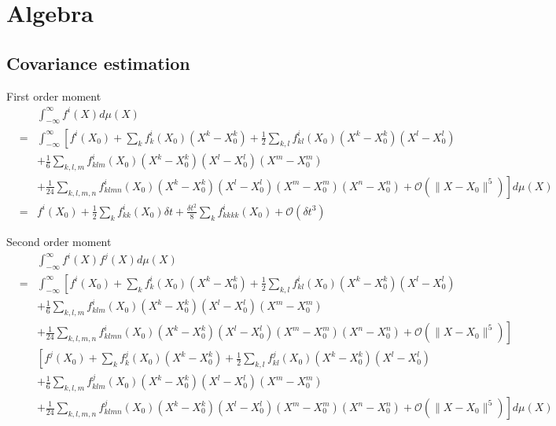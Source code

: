 \documentclass[12pt]{article}
\begin{document}
\appendix

\section{Algebra}

\subsection{Covariance estimation}

First order moment
\begin{eqnarray}
&&\int_{-\infty}^{\infty} f^i(X) d\mu(X) \\
&= & \int_{-\infty}^{\infty} \left[ f^i(X_0) + \sum_k f^i_k(X_0) (X^k-X_0^k)  + \frac{1}{2} \sum_{k,l} f^i_{kl}(X_0) (X^k-X_0^k) (X^l-X_0^l)  \right. \\
&& + \frac{1}{6} \sum_{k,l,m} f^i_{klm} (X_0) (X^k-X_0^k) (X^l-X_0^l) (X^m-X_0^m) \\
&& \left. + \frac{1}{24} \sum_{k,l,m,n} f^i_{klmn} (X_0) (X^k-X_0^k) (X^l-X_0^l) (X^m-X_0^m) (X^n-X_0^n)
+ \mathcal{O}\left( \| X- X_0 \|^5 \right) \right] d\mu(X) \\
&=& f^i(X_0) + \frac{1}{2} \sum_k f^i_{kk}(X_0) \delta t + \frac{\delta t^2}{8} \sum_{k} f^i_{kkkk} (X_0) + \mathcal{O} (\delta t^3 )
\end{eqnarray}

Second order moment
\begin{eqnarray}
&&\int_{-\infty}^{\infty} f^i(X) f^j(X) d\mu(X) \\
&= &
\int_{-\infty}^{\infty} \left[ f^i(X_0) + \sum_k f^i_k(X_0) (X^k-X_0^k)  + \frac{1}{2} \sum_{k,l} f^i_{kl}(X_0) (X^k-X_0^k) (X^l-X_0^l) \right. \\
&&  + \frac{1}{6} \sum_{k,l,m} f^i_{klm} (X_0) (X^k-X_0^k) (X^l-X_0^l) (X^m-X_0^m) \\
&& \left. + \frac{1}{24} \sum_{k,l,m,n} f^i_{klmn} (X_0) (X^k-X_0^k) (X^l-X_0^l) (X^m-X_0^m) (X^n-X_0^n)
+ \mathcal{O}\left( \| X- X_0 \|^5 \right) \right]  \\
&& \left[ f^j(X_0) + \sum_k f^j_k(X_0) (X^k-X_0^k)  + \frac{1}{2} \sum_{k,l} f^j_{kl}(X_0) (X^k-X_0^k) (X^l-X_0^l)  \right. \\
&&  + \frac{1}{6} \sum_{k,l,m} f^j_{klm} (X_0) (X^k-X_0^k) (X^l-X_0^l) (X^m-X_0^m)  \\
&&  \left. + \frac{1}{24} \sum_{k,l,m,n} f^j_{klmn} (X_0) (X^k-X_0^k) (X^l-X_0^l) (X^m-X_0^m) (X^n-X_0^n)
+ \mathcal{O}\left( \| X- X_0 \|^5 \right) \right]  d\mu(X) 
\end{eqnarray}
\end{document}
